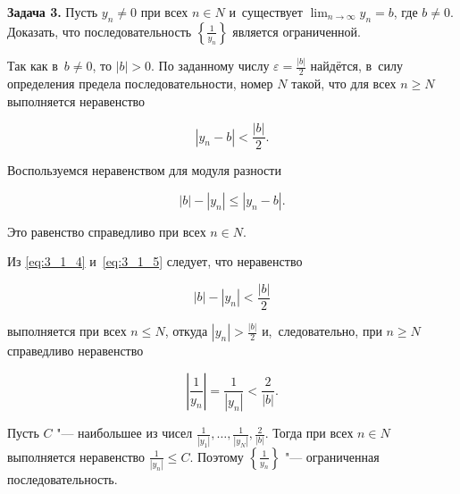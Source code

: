 \textbf{Задача 3.}\label{ex:3_1_3} Пусть $y_{n} \ne 0$ при всех $n \in N$
и~существует $\displaystyle \lim_{n \to \infty} y_{n} = b$, где $b \ne 0$.
Доказать, что последовательность $\displaystyle \left\{ \frac{1}{y_{n}} \right\}$
является ограниченной.

Так как в~$b \ne 0$, то $|b| > 0$. По заданному числу
$\displaystyle \varepsilon = \frac{|b|}{2}$ найдётся, в~силу определения предела
последовательности, номер $N$ такой, что для всех $n \geqslant N$ выполняется
неравенство

\begin{equation}\label{eq:3_1_4}
\displaystyle |y_{n} - b| < \frac{|b|}{2}.
\end{equation}

\noindent
Воспользуемся неравенством для модуля разности

\begin{equation}\label{eq:3_1_5}
|b| - |y_{n}| \leqslant |y_{n} - b|.
\end{equation}

\noindent
Это равенство справедливо при всех $n \in N$.

Из \eqref{eq:3_1_4} и~\eqref{eq:3_1_5} следует, что неравенство

\begin{equation*}
\displaystyle |b| - |y_{n}| < \frac{|b|}{2}
\end{equation*}

\noindent
выполняется при всех $n \leqslant N$, откуда $\displaystyle |y_{n}| > \frac{|b|}{2}$
и,~следовательно, при $n \geqslant N$ справедливо неравенство

\begin{equation*}
\displaystyle \left| \frac{1}{y_{n}} \right| = \frac{1}{|y_{n}|} < \frac{2}{|b|}.
\end{equation*}

\noindent
Пусть $C$ "--- наибольшее из чисел
$\displaystyle \frac{1}{|y_{1}|}, \dots, \frac{1}{|y_{N}|}, \frac{2}{|b|}$.
Тогда при всех $n \in N$ выполняется неравенство
$\displaystyle \frac{1}{|y_{n}|} \leqslant C$.
Поэтому $\displaystyle \left\{ \frac{1}{y_{n}} \right\}$ "--- ограниченная
последовательность.

